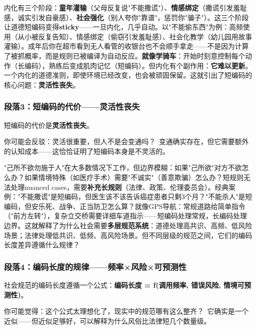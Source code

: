 \documentclass[../main.tex]{subfiles}
\begin{document}
内化有三个阶段：\textbf{童年灌输}（父母反复说"不能撒谎"）、\textbf{情感绑定}（撒谎引发羞耻感，诚实引发自豪感）、\textbf{社会强化}（别人夸你"靠谱"，惩罚你"骗子"）。这三个阶段让道德短编码变得\textbf{sticky}——一旦内化，几乎自动。以"不能偷东西"为例：高频使用（从小被反复告知）、情感绑定（偷窃引发羞耻感）、社会化教学（幼儿园用故事灌输）。成年后你在超市看到无人看管的收银台也不会顺手拿走——不是因为计算了被抓概率，而是规则已被编译为自动反应。\textbf{就像学骑车}：开始时刻意控制每个动作（长编码），熟练后变成肌肉记忆（短编码）。但内化有个副作用：\textbf{它难以更新}。一个内化的道德准则，即使环境已经改变，也会被顽固保留。这就引出了短编码的核心问题：\textbf{灵活性丧失}。

	\subsubsection*{段落3：短编码的代价——灵活性丧失}

	短编码的代价是\textbf{灵活性丧失}。

	\begin{tcolorbox}[colback=yellow!5, title=\textit{读者行为预测}]

		你可能会反驳：灵活很重要，但人不是会变通吗？\ 变通确实存在，但它需要额外的认知成本——这恰恰证明了短编码本身是不灵活的。

	\end{tcolorbox}

"己所不欲勿施于人"在大多数情况下工作，但边界模糊：如果"己所欲"对方不欲怎么办？如果情境特殊（如医疗手术）需要"不诚实"（善意欺骗）怎么办？短规则无法处理nuanced cases，需要\textbf{补充长规则}（法律、政策、伦理委员会）。经典案例："不能撒谎"是短编码，但医生该不该告诉癌症患者只剩3个月？"不能杀人"是短编码，但安乐死、战争、正当防卫怎么算？就像GPS导航：常规道路给简单指令（"前方左转"），复杂立交桥需要详细车道指示——短编码处理常规，长编码处理边界。这就解释了为什么社会需要\textbf{多层规范系统}：道德处理高共识、高频、低风险场景；法律处理低共识、低频、高风险场景。但不同层级的规范之间，它们的编码长度差异遵循什么规律？

	\subsubsection*{段落4：编码长度的规律——频率×风险×可预测性}

	社会规范的编码长度遵循一个公式：\textbf{编码长度 = f(调用频率, 错误风险, 情境可预测性)}。

	\begin{tcolorbox}[colback=yellow!5, title=\textit{读者行为预测}]

		你可能觉得：这个公式太理想化了，现实中的规范哪有这么整齐？\ 它确实是一个近似——但近似足够好，可以解释为什么风俗比法律短几个数量级。

	\end{tcolorbox}
\end{document}
